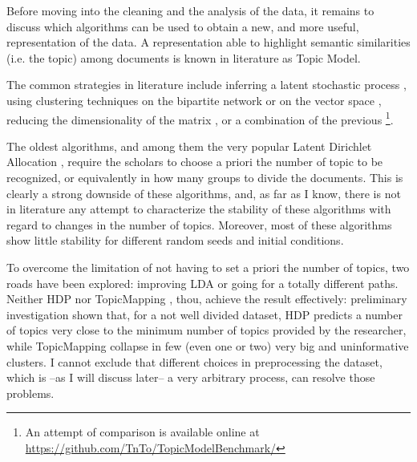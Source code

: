 \documentclass[a4paper, 11pt, headings=standardclasses, tablecaptionsbelow]{scrartcl}
\begin{document}
Before moving into the cleaning and the analysis of the data, it remains to discuss which algorithms can be used to obtain a new, and more useful, representation of the data. A representation able to highlight semantic similarities (i.e. the topic) among documents is known in literature as Topic Model.

The common strategies in literature include inferring a latent stochastic process \parencite{blei2003,teh2005,griffiths2004,hofmann1999}, using clustering techniques on the bipartite network \parencite{gerlach2018} or on the vector space \parencite{angelov2020,grootendorst2022}, reducing the dimensionality of the matrix \parencite{kim2008}, or a combination of the previous \parencite{lancichinetti2015}\footnote{An attempt of comparison is available online at \url{https://github.com/TnTo/TopicModelBenchmark/}}.

The oldest algorithms, and among them the very popular Latent Dirichlet Allocation \parencite[LDA][]{blei2003}, require the scholars to choose a priori the number of topic to be recognized, or equivalently in how many groups to divide the documents. This is clearly a strong downside of these algorithms, and, as far as I know, there is not in literature any attempt to characterize the stability of these algorithms with regard to changes in the number of topics. Moreover, most of these algorithms show little stability for different random seeds and initial conditions.

To overcome the limitation of not having to set a priori the number of topics, two roads have been explored: improving LDA \parencite{teh2005,lancichinetti2015} or going for a totally different paths.
Neither HDP \parencite{teh2005} nor TopicMapping \parencite{lancichinetti2015}, thou, achieve the result effectively: preliminary investigation shown that, for a not well divided dataset, HDP predicts a number of topics very close to the minimum number of topics provided by the researcher, while TopicMapping collapse in few (even one or two) very big and uninformative clusters. I cannot exclude that different choices in preprocessing the dataset, which is --as I will discuss later-- a very arbitrary process, can resolve those problems.
\end{document}
